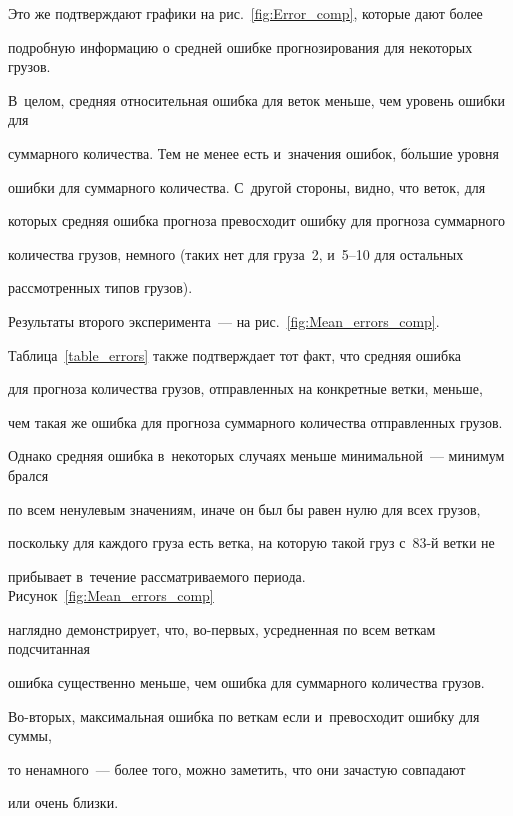 Это же подтверждают графики на рис.~\ref{fig:Error_comp}, которые дают более


подробную информацию о средней ошибке прогнозирования для некоторых грузов.


В~целом, средняя относительная ошибка для веток меньше, чем уровень ошибки для


суммарного количества. Тем не менее есть и~значения ошибок, б$\acute{\mbox{о}}$льшие уровня


ошибки для суммарного количества. С~другой стороны, видно, что веток, для


которых средняя ошибка прогноза превосходит ошибку для прогноза суммарного


количества грузов, немного (таких нет для груза~2, и~5--10 для остальных


рассмотренных типов грузов).











Результаты второго эксперимента~--- на рис.~\ref{fig:Mean_errors_comp}.


Таблица~\ref{table_errors} также подтверждает тот факт, что средняя ошибка


для прогноза количества грузов, отправленных на конкретные ветки, меньше,


чем такая же ошибка для прогноза суммарного количест\-ва отправленных грузов.


Однако средняя ошибка в~некоторых случаях меньше минимальной~--- минимум брался


по всем ненулевым значениям, иначе он был бы равен нулю для всех грузов,


поскольку для каждого груза есть ветка, на которую такой груз с~83-й ветки не


прибывает в~течение рассматриваемого периода. Рисунок~\ref{fig:Mean_errors_comp}


наглядно демонстрирует, что, во-пер\-вых, усредненная по всем веткам подсчитанная


ошибка существенно меньше, чем ошибка для суммарного количества грузов.


Во-вто\-рых, максимальная ошибка по веткам если и~превосходит ошибку для суммы,


то ненамного~--- более того, можно заметить, что они зачастую совпадают


или очень близки.











